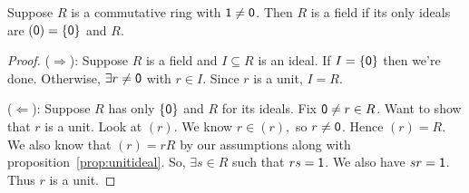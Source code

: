 \documentclass[notes.tex]{subfiles}
\begin{document}
\begin{corollary}
	Suppose $R$ is a commutative ring with $\mathsf{1}\ne\mathsf{0}$.
	Then $R$ is a field if its only ideals are $(\mathsf{0}) = \{\mathsf{0}\}$ and $R$.
\end{corollary}
\begin{proof}
	($\Longrightarrow$): Suppose $R$ is a field and $I\subseteq R$ is an ideal. If $I = \{\mathsf{0}\}$ then we're done. Otherwise, $\exists r\ne \mathsf{0}$ with $r\in I$. Since $r$ is a unit, $I = R$.

	($\Longleftarrow$): Suppose $R$ has only $\{\mathsf{0}\}$ and $R$ for its ideals. Fix $\mathsf{0}\ne r\in R$. Want to show that $r$ is a unit. 
	Look at $(r)$. We know $r\in (r),$ so $r\ne \mathsf{0}$.  Hence $(r) = R$. We also know that $(r) = rR$ by our assumptions along with proposition~\ref{prop:unitideal}. So, $\exists s\in R$ such that $rs = \mathsf{1}$. We also have $sr = \mathsf{1}$. Thus $r$ is a unit.
\end{proof}
\end{document}
